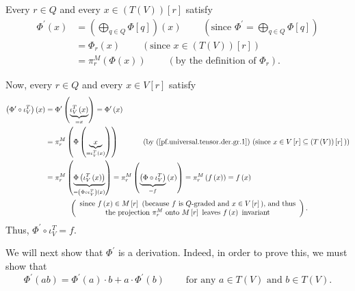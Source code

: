 \documentclass[etingof-lie.tex]{subfiles}
\begin{document}
\begin{verlong}
Every $r\in Q$ and every $x\in\left(  T\left(  V\right)  \right)  \left[
r\right]  $ satisfy%
\begin{align}
\Phi^{\prime}\left(  x\right)   &  =\left(  \bigoplus\limits_{q\in Q}%
\Phi\left[  q\right]  \right)  \left(  x\right)  \ \ \ \ \ \ \ \ \ \ \left(
\text{since }\Phi^{\prime}=\bigoplus\limits_{q\in Q}\Phi\left[  q\right]
\right) \nonumber\\
&  =\Phi_{r}\left(  x\right)  \ \ \ \ \ \ \ \ \ \ \left(  \text{since }%
x\in\left(  T\left(  V\right)  \right)  \left[  r\right]  \right) \nonumber\\
&  =\pi_{r}^{M}\left(  \Phi\left(  x\right)  \right)
\ \ \ \ \ \ \ \ \ \ \left(  \text{by the definition of }\Phi_{r}\right)  .
\label{pf.universal.tensor.der.gr.1}%
\end{align}


Now, every $r\in Q$ and every $x\in V\left[  r\right]  $ satisfy%
\begin{align*}
\left(  \Phi^{\prime}\circ\iota_{V}^{T}\right)  \left(  x\right)   &
=\Phi^{\prime}\left(  \underbrace{\iota_{V}^{T}\left(  x\right)  }%
_{=x}\right)  =\Phi^{\prime}\left(  x\right) \\
&  =\pi_{r}^{M}\left(  \Phi\left(  \underbrace{x}_{=\iota_{V}^{T}\left(
x\right)  }\right)  \right)  \ \ \ \ \ \ \ \ \ \ \left(  \text{by
(\ref{pf.universal.tensor.der.gr.1}) (since }x\in V\left[  r\right]
\subseteq\left(  T\left(  V\right)  \right)  \left[  r\right]  \text{)}\right)
\\
&  =\pi_{r}^{M}\left(  \underbrace{\Phi\left(  \iota_{V}^{T}\left(  x\right)
\right)  }_{=\left(  \Phi\circ\iota_{V}^{T}\right)  \left(  x\right)
}\right)  =\pi_{r}^{M}\left(  \underbrace{\left(  \Phi\circ\iota_{V}%
^{T}\right)  }_{=f}\left(  x\right)  \right)  =\pi_{r}^{M}\left(  f\left(
x\right)  \right)  =f\left(  x\right) \\
&  \ \ \ \ \ \ \ \ \ \ \left(
\begin{array}
[c]{c}%
\text{since }f\left(  x\right)  \in M\left[  r\right]  \text{ (because
}f\text{ is }Q\text{-graded and }x\in V\left[  r\right]  \text{), and thus}\\
\text{the projection }\pi_{r}^{M}\text{ onto }M\left[  r\right]  \text{ leaves
}f\left(  x\right)  \text{ invariant}%
\end{array}
\right)  .
\end{align*}
Thus, $\Phi^{\prime}\circ\iota_{V}^{T}=f$.

We will next show that $\Phi^{\prime}$ is a derivation. Indeed, in order to
prove this, we must show that%
\begin{equation}
\Phi^{\prime}\left(  ab\right)  =\Phi^{\prime}\left(  a\right)  \cdot
b+a\cdot\Phi^{\prime}\left(  b\right)  \ \ \ \ \ \ \ \ \ \ \text{for any }a\in
T\left(  V\right)  \text{ and }b\in T\left(  V\right)  .
\label{pf.universal.tensor.der.gr.2}%
\end{equation}



\end{verlong}
\end{document}
